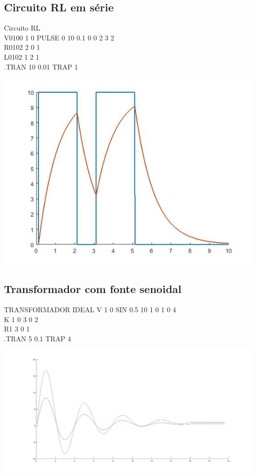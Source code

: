 \documentclass[12pt]{article}
\begin{document}
\subsection{Circuito RL em série}
  Circuito RL\\
  V0100 1 0 PULSE 0 10 0.1 0 0 2 3 2\\
  R0102 2 0 1\\
  L0102 1 2 1\\
  .TRAN 10 0.01 TRAP 1\\

  \begin{center}
  \hspace*{-2.5cm}\includegraphics[scale=0.75]{rl}
  \end{center}
\pagebreak
\subsection{Transformador com fonte senoidal}
  TRANSFORMADOR IDEAL
  V 1 0 SIN 0.5 10 1 0 1 0 4\\
  K 1 0 3 0 2\\
  R1 3 0 1\\
  .TRAN 5 0.1 TRAP 4\\

  \begin{center}
  \hspace*{-5cm}\includegraphics[scale=0.4]{transformador}
  \end{center}
\pagebreak
\end{document}

